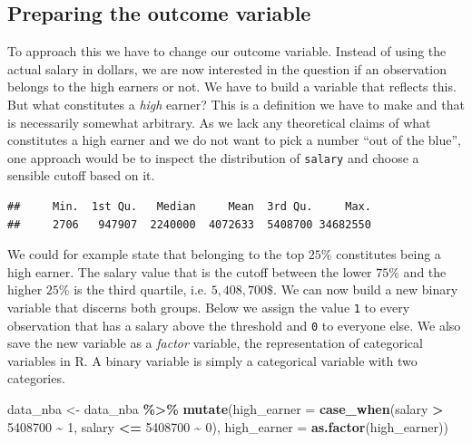 \documentclass[
]{book}
\newenvironment{Shaded}{\begin{snugshade}}{\end{snugshade}}
\newcommand{\AttributeTok}[1]{\textcolor[rgb]{0.13,0.29,0.53}{#1}}
\newcommand{\DecValTok}[1]{\textcolor[rgb]{0.00,0.00,0.81}{#1}}
\newcommand{\FunctionTok}[1]{\textcolor[rgb]{0.13,0.29,0.53}{\textbf{#1}}}
\newcommand{\NormalTok}[1]{#1}
\newcommand{\OtherTok}[1]{\textcolor[rgb]{0.56,0.35,0.01}{#1}}
\newcommand{\SpecialCharTok}[1]{\textcolor[rgb]{0.81,0.36,0.00}{\textbf{#1}}}
\begin{document}
\hypertarget{preparing-the-outcome-variable}{%
\subsection{Preparing the outcome variable}\label{preparing-the-outcome-variable}}

To approach this we have to change our outcome variable. Instead of
using the actual salary in dollars, we are now interested in the
question if an observation belongs to the high earners or not. We have
to build a variable that reflects this. But what constitutes a \emph{high}
earner? This is a definition we have to make and that is necessarily
somewhat arbitrary. As we lack any theoretical claims of what
constitutes a high earner and we do not want to pick a number ``out of
the blue'', one approach would be to inspect the distribution of \texttt{salary}
and choose a sensible cutoff based on it.

\begin{Shaded}
\end{Shaded}

\begin{verbatim}
##     Min.  1st Qu.   Median     Mean  3rd Qu.     Max. 
##     2706   947907  2240000  4072633  5408700 34682550
\end{verbatim}

We could for example state that belonging to the top \(25\%\) constitutes
being a high earner. The salary value that is the cutoff between the
lower \(75\%\) and the higher \(25\%\) is the third quartile, i.e.
\(5,408,700\$\). We can now build a new binary variable that discerns both
groups. Below we assign the value \texttt{1} to every observation that has a
salary above the threshold and \texttt{0} to everyone else. We also save the
new variable as a \emph{factor} variable, the representation of categorical
variables in R. A binary variable is simply a categorical variable with
two categories.

\begin{Shaded}
\begin{Highlighting}[]
\NormalTok{data\_nba }\OtherTok{\textless{}{-}}\NormalTok{ data\_nba }\SpecialCharTok{\%\textgreater{}\%}
  \FunctionTok{mutate}\NormalTok{(}\AttributeTok{high\_earner =} 
           \FunctionTok{case\_when}\NormalTok{(salary }\SpecialCharTok{\textgreater{}} \DecValTok{5408700} \SpecialCharTok{\textasciitilde{}} \DecValTok{1}\NormalTok{,}
\NormalTok{                     salary }\SpecialCharTok{\textless{}=} \DecValTok{5408700} \SpecialCharTok{\textasciitilde{}} \DecValTok{0}\NormalTok{),}
         \AttributeTok{high\_earner =} \FunctionTok{as.factor}\NormalTok{(high\_earner))}
\end{Highlighting}
\end{Shaded}
\end{document}
